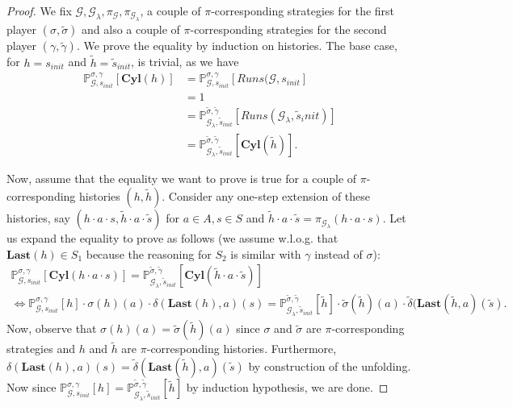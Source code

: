 \documentclass{article}
\newcommand{\IP}{\mathbb{P}}
\newcommand{\CG}{\mathcal{G}}
\newcommand{\Last}{\textbf{Last}}
\newcommand{\Cyl}{\textbf{Cyl}}
\theoremstyle{plain}
\begin{document}
\begin{proof}
We fix $\CG, \CG_{\lambda}, \pi_{\CG}, \pi_{\CG_{\lambda}}$, a couple of $\pi$-corresponding strategies for the first player $(\sigma, \tilde{\sigma})$ and also a couple of $\pi$-corresponding strategies for the second player $(\gamma, \tilde{\gamma})$. We prove the equality by induction on histories. The base case, for $h = s_{init}$ and $\tilde{h} = \tilde{s}_{init}$, is trivial, as we have
\begin{align*}
\IP^{\sigma, \gamma}_{\CG, s_{init}}[\Cyl(h)]
&= \IP^{\sigma, \gamma}_{\CG, s_{init}}[Runs(\CG, s_{init}]\\
&= 1\\
&=\IP^{\tilde{\sigma}, \tilde{\gamma}}_{\CG_{\lambda}, \tilde{s}_{init}}[Runs(\CG_{\lambda}, \tilde{s}_init)]\\
&= \IP^{\tilde{\sigma}, \tilde{\gamma}}_{\CG_{\lambda}, \tilde{s}_{init}}[\Cyl(\tilde{h})].
\end{align*}

Now, assume that the equality we want to prove is true for a couple of $\pi$-corresponding histories $(h, \tilde{h})$. Consider any one-step extension of these histories, say $(h \cdot a \cdot s, \tilde{h} \cdot a \cdot \tilde{s})$ for $a \in A, s \in S$ and $\tilde{h} \cdot a \cdot \tilde{s} = \pi_{\CG_{\lambda}}(h \cdot a \cdot s)$. Let us expand the equality to prove as follows (we assume w.l.o.g. that $\Last(h) \in S_1$ because the reasoning for $S_2$ is similar with $\gamma$ instead of $\sigma$):
\begin{align*}
\IP_{\CG, s_{init}}^{\sigma, \gamma} [\Cyl(h \cdot a \cdot s)] = \IP_{\CG_{\lambda}, \tilde{s}_{init}}^{\tilde{\sigma}, \tilde{\gamma}} [\Cyl(\tilde{h} \cdot a \cdot \tilde{s})]\\
\iff \IP^{\sigma, \gamma}_{\CG, s_{init}}[h] \cdot \sigma(h)(a) \cdot \delta(\Last(h), a)(s) = \IP^{\tilde{\sigma}, \tilde{\gamma}}_{\CG_{\lambda}, \tilde{s}_{init}}[\tilde{h}] \cdot \tilde{\sigma}(\tilde{h})(a) \cdot \tilde{\delta}(\Last(\tilde{h}, a)(\tilde{s}).
\end{align*}
Now, observe that $\sigma(h)(a) = \tilde{\sigma}(\tilde{h})(a)$ since $\sigma$ and $\tilde{\sigma}$ are $\pi$-corresponding strategies and $h$ and $\tilde{h}$ are $\pi$-corresponding histories. Furthermore, $\delta(\Last(h), a)(s) = \tilde{\delta}(\Last(\tilde{h}), a)(\tilde{s})$ by construction of the unfolding. Now since $\IP^{\sigma, \gamma}_{\CG, s_{init}}[h] = \IP^{\tilde{\sigma}, \tilde{\gamma}}_{\CG_{\lambda}, \tilde{s}_{init}}[\tilde{h}]$ by induction hypothesis, we are done.
\end{proof}
\end{document}
